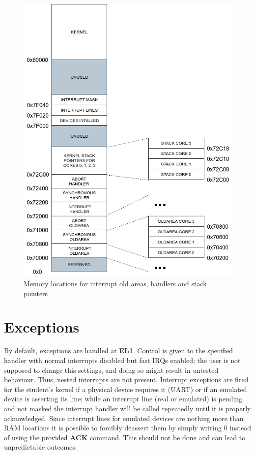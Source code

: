 \documentclass[12pt,a4paper,openright,twoside]{report}
\begin{document}
 \begin{figure}[h]
    \begin{center}
 \includegraphics[scale=0.55]{images/tesi14.png}
 \caption[Memory Map]{Memory locations for interrupt old areas, handlers 
 and stack pointers}\label{fig:memmap}
    \end{center}
 \end{figure}

 \newpage

\section{Exceptions}
By default, exceptions are handled at \textbf{EL1}. Control is given to the 
specified handler with normal interrupts disabled but fast IRQs enabled; the user
is not supposed to change this settings, and doing so might result in untested
behaviour.
Thus, nested interrupts are not present. Interrupt exceptions are fired
for the student's kernel if a physical device requires it (UART) or if an 
emulated device is asserting its line; while an interrupt line (real or 
emulated) is pending and not masked the interrupt handler will be called repeatedly
until it is properly acknowledged.
Since interrupt lines for emulated devices are nothing more than RAM locations
it is possible to forcibly deassert them by simply writing 0 instead of using
the provided \textbf{ACK} command. This should not be done and can lead to 
unpredictable outcomes.
\end{document}
